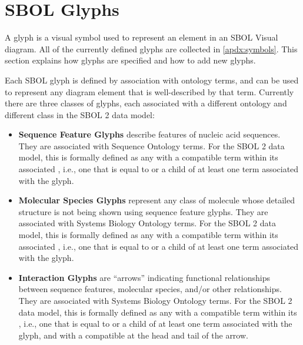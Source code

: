 \section{SBOL Glyphs}\label{sec:glyphs}


A glyph is a visual symbol used to represent an element in an SBOL Visual diagram.
All of the currently defined glyphs are collected in \ref{apdx:symbols}.
%
This section explains how glyphs are specified and how to add new glyphs.

Each SBOL glyph is defined by association with ontology terms, and can be used to represent any diagram element that is well-described by that term.
Currently there are three classes of glyphs, each associated with a different ontology and different class in the SBOL 2 data model:
\begin{itemize}
\item {\bf Sequence Feature Glyphs} describe features of nucleic acid sequences. They are associated with Sequence Ontology terms.
For the SBOL 2 data model, this is formally defined as any  with a compatible term within its associated ,
 i.e., one that is equal to or a child of at least one term associated with the glyph.
\item {\bf Molecular Species Glyphs} represent any class of molecule whose detailed structure is not being shown using sequence feature glyphs. They are associated with Systems Biology Ontology terms.  For the SBOL 2 data model, this is formally defined as any  with a compatible term within its associated ,
 i.e., one that is equal to or a child of at least one term associated with the glyph.
\item {\bf Interaction Glyphs} are ``arrows'' indicating functional relationships between sequence features, molecular species, and/or other relationships. They are associated with Systems Biology Ontology terms.
For the SBOL 2 data model, this is formally defined as any  with a compatible term within its ,
 i.e., one that is equal to or a child of at least one term associated with the glyph, 
 and with a compatible  at the head and tail of the arrow.
 \end{itemize}
 
